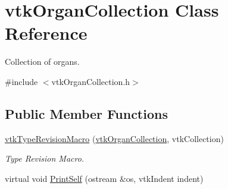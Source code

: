 \hypertarget{classvtkOrganCollection}{
\section{vtkOrganCollection Class Reference}
\label{classvtkOrganCollection}
}


Collection of organs.  


{\ttfamily \#include $<$vtkOrganCollection.h$>$}\subsection*{Public Member Functions}
\begin{DoxyCompactItemize}
\item 
\hypertarget{classvtkOrganCollection_a54e95f6cf19cfe045483cf5b0d665958}{
\hyperlink{classvtkOrganCollection_a54e95f6cf19cfe045483cf5b0d665958}{vtkTypeRevisionMacro} (\hyperlink{classvtkOrganCollection}{vtkOrganCollection}, vtkCollection)}
\label{classvtkOrganCollection_a54e95f6cf19cfe045483cf5b0d665958}

\begin{DoxyCompactList}\small\item\em Type Revision Macro. \item\end{DoxyCompactList}\item 
\hypertarget{classvtkOrganCollection_aa5c16d7a18c0cf5ee6e867850415a26c}{
virtual void \hyperlink{classvtkOrganCollection_aa5c16d7a18c0cf5ee6e867850415a26c}{PrintSelf} (ostream \&os, vtkIndent indent)}
\label{classvtkOrganCollection_aa5c16d7a18c0cf5ee6e867850415a26c}


\end{DoxyCompactItemize}
